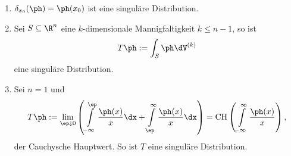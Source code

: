 \begin{bsp}
\label{bsp:3.9}
\begin{enumerate}[label=\arabic{*}.)]
  \item $\delta_{x_0}(\ph) = \ph(x_0)$ ist eine singuläre Distribution.
  \item Sei $S\subseteq \R^n$ eine $k$-dimensionale Mannigfaltigkeit $k\le
  n-1$, so ist
  \begin{align*}
  T\ph := \int_S \ph\dV^{(k)}      
  \end{align*}
eine singuläre Distribution.
\item Sei $n=1$ und
\begin{align*}
T\ph := \lim\limits_{\ep\downarrow 0} \left( \int\limits_{-\infty}^\ep
\frac{\ph(x)}{x}\dx + \int\limits_{\ep}^\infty \frac{\ph(x)}{x}\dx \right)
= \mathrm{CH}\left(\int\limits_{-\infty}^\infty \frac{\ph(x)}{x} \right), 
\end{align*}
der Cauchysche Hauptwert. So ist $T$ eine singuläre Distribution.\bsphere
\end{enumerate}
\end{bsp}


